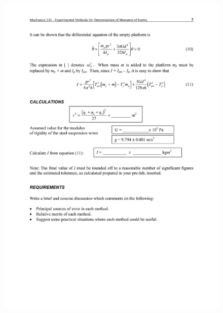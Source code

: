 \begin{figure}
 \includegraphics[width=\linewidth]{lab1/lab1-5}
  \caption*{}
\label{}
\end{figure}
